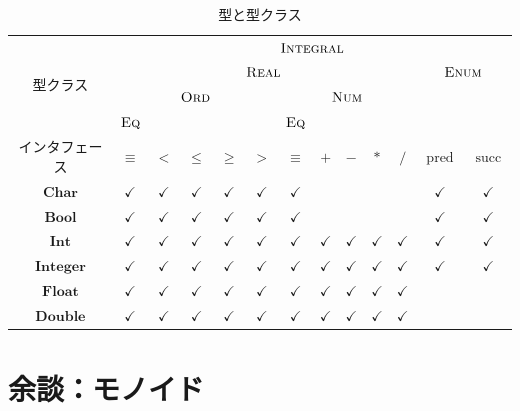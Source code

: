 \documentclass[a5paper,twoside,fleqn]{jsbook}
\newcommand{\mSpecialFunc}[1]{\mathrm{#1}}
\DeclareMathOperator{\mPred}{\mSpecialFunc{pred}}
\DeclareMathOperator{\mSucc}{\mSpecialFunc{succ}}
\newcommand{\mType}[1]{\mathbf{#1}}
\newcommand{\mBoolType}{\mType{Bool}}
\newcommand{\mCharType}{\mType{Char}}
\newcommand{\mFloatType}{\mType{Float}}
\newcommand{\mDoubleType}{\mType{Double}}
\newcommand{\mIntType}{\mType{Int}}
\newcommand{\mIntegerType}{\mType{Integer}}
\newcommand{\mGenericTypeClass}[1]{\textsc{#1}} %
\newcommand{\mEnumTypeClass}{\mGenericTypeClass{Enum}}
\newcommand{\mEqTypeClass}{\mGenericTypeClass{Eq}}
\newcommand{\mIntegralTypeClass}{\mGenericTypeClass{Integral}}
\newcommand{\mNumTypeClass}{\mGenericTypeClass{Num}}
\newcommand{\mOrdTypeClass}{\mGenericTypeClass{Ord}}
\newcommand{\mRealTypeClass}{\mGenericTypeClass{Real}}
\begin{document}
\begin{table}
\caption{型と型クラス}
\label{tab:type-and-typeclass}
\begin{center}
\begin{tabular}{||c||c|c|c|c|c|c|c|c|c|c|c|c||}
\hline \multirow{4}{*}{型クラス}
&\multicolumn{12}{|c||}{$\mIntegralTypeClass$}\\ \cline{2-13}
\multirow{3}{*}{} &\multicolumn{10}{|c|}{$\mRealTypeClass$}
&\multicolumn{2}{|c||}{$\mEnumTypeClass$}\\ \cline{2-11}
\multirow{2}{*}{} &\multicolumn{5}{|c|}{$\mOrdTypeClass$}
&\multicolumn{5}{|c|}{$\mNumTypeClass$} &\multicolumn{2}{|c||}{
}\\ \cline{2-2}\cline{7-7} { } &$\mEqTypeClass$ &\multicolumn{4}{|c|}{
} &$\mEqTypeClass$ &\multicolumn{4}{|c|}{ } &\multicolumn{2}{|c||}{
}\\ \hline インタフェース&$\equiv$ &$<$ &$\le$ &$\ge$ &$>$ &$\equiv$
&$+$ &$-$ &$*$ &$/$ &$\mPred$ &$\mSucc$\\ \hline\hline $\mCharType$
&$\checkmark$ &$\checkmark$ &$\checkmark$ &$\checkmark$ &$\checkmark$
&$\checkmark$ & & & & &$\checkmark$ &$\checkmark$\\ \hline
$\mBoolType$ &$\checkmark$ &$\checkmark$ &$\checkmark$ &$\checkmark$
&$\checkmark$ &$\checkmark$ & & & & &$\checkmark$
&$\checkmark$\\ \hline $\mIntType$ &$\checkmark$ &$\checkmark$
&$\checkmark$ &$\checkmark$ &$\checkmark$ &$\checkmark$ &$\checkmark$
&$\checkmark$ &$\checkmark$ &$\checkmark$ &$\checkmark$
&$\checkmark$\\ \hline $\mIntegerType$ &$\checkmark$ &$\checkmark$
&$\checkmark$ &$\checkmark$ &$\checkmark$ &$\checkmark$ &$\checkmark$
&$\checkmark$ &$\checkmark$ &$\checkmark$ &$\checkmark$
&$\checkmark$\\ \hline $\mFloatType$ &$\checkmark$ &$\checkmark$
&$\checkmark$ &$\checkmark$ &$\checkmark$ &$\checkmark$ &$\checkmark$
&$\checkmark$ &$\checkmark$ &$\checkmark$ & &\\ \hline $\mDoubleType$
&$\checkmark$ &$\checkmark$ &$\checkmark$ &$\checkmark$ &$\checkmark$
&$\checkmark$ &$\checkmark$ &$\checkmark$ &$\checkmark$ &$\checkmark$
& &\\ \hline
\end{tabular}
\end{center}
\end{table}

\section{余談：モノイド}
\end{document}

